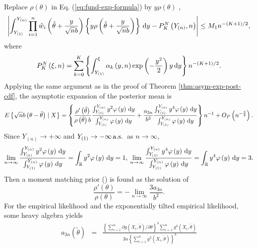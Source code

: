 \begin{example}
Replace $\rho\left(\theta\right)$ in Eq. (\ref{eq:fund-exp-formula})
by $y\rho\left(\theta\right)$ , 
\[
\left|\int_{Y_{\left(1\right)}}^{Y_{\left(n\right)}}\prod_{i=1}^{n}\hat{w}_{i}\left(\tilde{\theta}+\frac{y}{\sqrt{n}b}\right)\left\{ y\rho\left(\tilde{\theta}+\frac{y}{\sqrt{n}b}\right)\right\} \,\mathrm{d} y-P_{K}^{N}\left(Y_{\left(n\right)},n\right)\right|\le M_{1}n^{-\left(K+1\right)/2},
\]
where 
\[
P_{K}^{N}\left(\xi,n\right)=\sum_{k=0}^{K}\left\{ \int_{Y_{\left(1\right)}}^{\xi}\alpha_{k}\left(y,n\right)\exp\left(-\frac{y^{2}}{2}\right)y\,\mathrm{d} y\right\} n^{-\left(K+1\right)/2}.
\]
Applying the same argument as in the proof of Theorem \ref{thm:asym-exp-post-cdf},
the asymptotic expansion of the posterior mean is 
\[
E\left\{ \sqrt{n}b\left(\theta-\tilde{\theta}\right)\mid X\right\} =\left\{ \frac{\rho'\left(\tilde{\theta}\right)}{\rho\left(\tilde{\theta}\right)b}\frac{\int_{Y_{\left(1\right)}}^{Y_{\left(n\right)}}y^{2}\varphi\left(y\right)\,\mathrm{d} y}{\int_{Y_{\left(1\right)}}^{Y_{\left(n\right)}}\varphi\left(y\right)\,\mathrm{d} y}+\frac{a_{3n}}{b^{3}}\frac{\int_{Y_{\left(1\right)}}^{Y_{\left(n\right)}}y^{4}\varphi\left(y\right)\,\mathrm{d} y}{\int_{Y_{\left(1\right)}}^{Y_{\left(n\right)}}\varphi\left(y\right)\,\mathrm{d} y}\right\} n^{-1}+O_{P}\left(n^{-\frac{3}{2}}\right).
\]
Since $ Y_{\left( n \right )} \rightarrow + \infty $ and $ Y_{\left (1\right )} \rightarrow - \infty\,\mathrm{a.s.}\, $ as $n\rightarrow\infty$,
\[
	\lim_{n\rightarrow\infty} \frac{\int_{Y_{\left(1\right)}}^{Y_{\left(n\right)}}y^{2}\varphi\left(y\right)\,\mathrm{d} y}{\int_{Y_{\left(1\right)}}^{Y_{\left(n\right)}}\varphi\left(y\right)\,\mathrm{d} y} = \int_{\mathbb{R}} y^2 \varphi \left(y\right) \,\mathrm{d} y=1,\:
	\lim_{n\rightarrow\infty} \frac{\int_{Y_{\left(1\right)}}^{Y_{\left(n\right)}}y^{4}\varphi\left(y\right)\,\mathrm{d} y}{\int_{Y_{\left(1\right)}}^{Y_{\left(n\right)}}\varphi\left(y\right)\,\mathrm{d} y} = \int_{\mathbb{R}} y^4 \varphi \left(y\right) \,\mathrm{d} y=3.
\]
Then a moment matching prior (\cite{ghosh2011moment}) is found as  the
solution of 
\[
\frac{\rho'\left(\theta\right)}{\rho\left(\theta\right)}=-\lim_{n\rightarrow\infty}\frac{3a_{3n}}{b^{2}}.
\]
 For the empirical likelihood and the 
exponentially tilted empirical likelihood, some heavy algebra yields
\begin{eqnarray*}
a_{3n}\left(\tilde{\theta}\right) & = & \frac{\left\{ \sum_{i=1}^{n}\partial g\left(X_{i},\tilde{\theta}\right)/\partial\theta\right\} ^{3}\sum_{i=1}^{n}g^{3}\left(X_{i},\tilde{\theta}\right)}{3n\left\{ \sum_{i=1}^{n}g^{2}\left(X_{i},\tilde{\theta}\right)\right\} ^{3}}\\

\end{eqnarray*}
\end{example}
